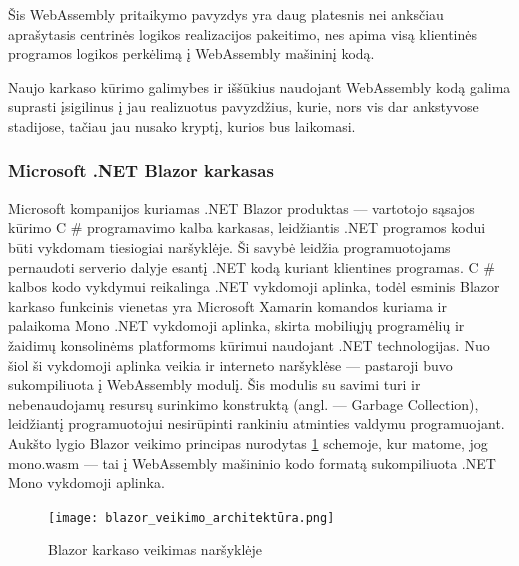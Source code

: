 \documentclass{VUMIFPSkursinis}
\begin{document}
Šis WebAssembly pritaikymo pavyzdys yra daug platesnis nei anksčiau aprašytasis centrinės logikos realizacijos pakeitimo, nes apima visą klientinės programos logikos perkėlimą į WebAssembly mašininį kodą.

Naujo karkaso kūrimo galimybes ir iššūkius naudojant WebAssembly kodą galima suprasti įsigilinus į jau realizuotus pavyzdžius, kurie, nors vis dar ankstyvose stadijose, tačiau jau nusako kryptį, kurios bus laikomasi.

\subsubsection{Microsoft .NET Blazor karkasas}
Microsoft kompanijos kuriamas .NET Blazor produktas — vartotojo sąsajos kūrimo C \# programavimo kalba karkasas, leidžiantis .NET programos kodui būti vykdomam tiesiogiai naršyklėje. Ši savybė leidžia programuotojams pernaudoti serverio dalyje esantį .NET kodą kuriant klientines programas.
C \# kalbos kodo vykdymui reikalinga .NET vykdomoji aplinka, todėl esminis Blazor karkaso funkcinis vienetas yra Microsoft Xamarin komandos kuriama ir palaikoma Mono .NET vykdomoji aplinka, skirta mobiliųjų programėlių ir žaidimų konsolinėms platformoms kūrimui naudojant .NET technologijas. Nuo šiol ši vykdomoji aplinka veikia ir interneto naršyklėse — pastaroji buvo sukompiliuota į WebAssembly modulį. Šis modulis su savimi turi ir nebenaudojamų resursų surinkimo konstruktą (angl. — Garbage Collection), leidžiantį programuotojui nesirūpinti rankiniu atminties valdymu programuojant. Aukšto lygio Blazor veikimo principas nurodytas \ref{fig:blazor_architecture} schemoje, kur matome, jog mono.wasm — tai į WebAssembly mašininio kodo formatą sukompiliuota .NET Mono vykdomoji aplinka.

\begin{figure}[h!]
  \begin{center}
  \texttt{[image: blazor\_veikimo\_architektūra.png]}
  \end{center}
  \caption{Blazor karkaso veikimas naršyklėje}
  \label{fig:blazor_architecture}
\end{figure}
\end{document}
